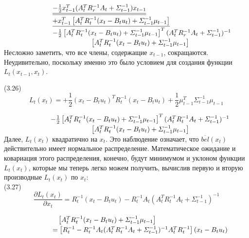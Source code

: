 \documentclass[10pt,a4paper]{article}
\begin{document}
$\hspace{25mm}\underline{\underline{-\frac{1}{2}x_{t-1}^T(A_t^T R_r^{-1}A_t+\varSigma_{t-1}^{-1})x_{t-1}}}$\\

$\hspace{25mm}\underline{+x_{t-1}^T\left[ A_t^T R_t^{-1}(x_t-B_t u_t)+\varSigma_{t-1}^{-1}\mu_{t-1}\right]}$\\

$\hspace{25mm}-\frac{1}{2}\left[ A_t^T R_t^{-1}(x_t-B_t u_t)+\varSigma_{t-1}^{-1}\mu_{t-1}\right]^T(A_t^T R_r^{-1}A_t+\varSigma_{t-1}^{-1})^{-1}$\\

$\hspace{45mm}\left[ A_t^T R_t^{-1}(x_t-B_t u_t)+\varSigma_{t-1}^{-1}\mu_{t-1}\right]$\\

Несложно заметить, что все члены, содержащие $x_{t-1}$, сокращаются. Неудивительно, поскольку именно это было условием для создания функции $L_t(x_{t-1},x_t)$.

(3.26)
$$L_t(x_t)=+\frac{1}{2}(x_t-B_t u_t)^T R_t^{-1}(x_t-B_t u_t)+\frac{1}{2}\mu_{t-1}^T \varSigma_{t-1}^{-1}\mu_{t-1}$$

 $\hspace{24mm}-\frac{1}{2}\left[ A_t^T R_t^{-1}(x_t-B_t u_t)+\varSigma_{t-1}^{-1}\mu_{t-1}\right]^T(A_t^T R_t^{-1}A_t+\varSigma_{t-1}^{-1})^{-1}$\\

$\hspace{45mm}\left[ A_t^T R_t^{-1}(x_t-B_t u_t)+\varSigma_{t-1}^{-1}\mu_{t-1}\right]$\\


Далее, $L_t(x_t)$ квадратично на $x_t$. Это наблюдение означает, что $\overline{bel}(x_t)$ действительно имеет нормальное распределение. Математическое ожидание и ковариация этого распределения, конечно, будут минимумом и уклоном функции $L_t(x_t)$, которые мы теперь легко можем получить, вычислив первую и вторую производные $L_t(x_t)$ по $x_t$:\\

(3.27)
$$\frac{\partial L_t(x_t)}{\partial x_t}=R_t^{-1}(x_t-B_t u_t)-R_t^{-1}A_t(A_t^T R_t^{-1}A_t+\varSigma_{t-1}^{-1})^{-1}$$

$\hspace{28mm}\left[ A_t^T R_t^{-1}(x_t-B_t u_t)+\varSigma_{t-1}^{-1}\mu_{t-1}\right]$\\

$\hspace{25mm}=\left[R_t^{-1}-R_t^{-1}A_t(A_t^TR_t^{-1}A_t+\varSigma_{t-1}^{-1})^{-1}A_t^T R_t^{-1}\right](x_t-B_t u_t)$\\
\end{document}
